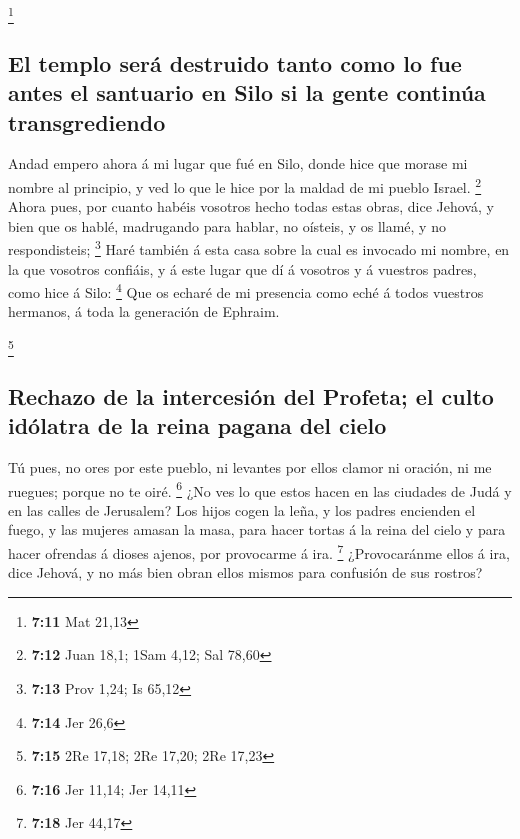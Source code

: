 \footnote{\textbf{7:11} Mat 21,13}

\hypertarget{el-templo-seruxe1-destruido-tanto-como-lo-fue-antes-el-santuario-en-silo-si-la-gente-continuxfaa-transgrediendo}{%
\subsection{El templo será destruido tanto como lo fue antes el
santuario en Silo si la gente continúa
transgrediendo}\label{el-templo-seruxe1-destruido-tanto-como-lo-fue-antes-el-santuario-en-silo-si-la-gente-continuxfaa-transgrediendo}}

 Andad empero ahora á mi lugar que fué en Silo, donde
hice que morase mi nombre al principio, y ved lo que le hice por la
maldad de mi pueblo Israel. \footnote{\textbf{7:12} Juan 18,1; 1Sam
  4,12; Sal 78,60}  Ahora pues, por cuanto habéis
vosotros hecho todas estas obras, dice Jehová, y bien que os hablé,
madrugando para hablar, no oísteis, y os llamé, y no respondisteis;
\footnote{\textbf{7:13} Prov 1,24; Is 65,12}  Haré
también á esta casa sobre la cual es invocado mi nombre, en la que
vosotros confiáis, y á este lugar que dí á vosotros y á vuestros padres,
como hice á Silo: \footnote{\textbf{7:14} Jer 26,6}  Que
os echaré de mi presencia como eché á todos vuestros hermanos, á toda la
generación de Ephraim.

\footnote{\textbf{7:15} 2Re 17,18; 2Re 17,20; 2Re 17,23}

\hypertarget{rechazo-de-la-intercesiuxf3n-del-profeta-el-culto-iduxf3latra-de-la-reina-pagana-del-cielo}{%
\subsection{Rechazo de la intercesión del Profeta; el culto idólatra de
la reina pagana del
cielo}\label{rechazo-de-la-intercesiuxf3n-del-profeta-el-culto-iduxf3latra-de-la-reina-pagana-del-cielo}}

 Tú pues, no ores por este pueblo, ni levantes por ellos
clamor ni oración, ni me ruegues; porque no te oiré. \footnote{\textbf{7:16}
  Jer 11,14; Jer 14,11}  ¿No ves lo que estos hacen en
las ciudades de Judá y en las calles de Jerusalem?  Los
hijos cogen la leña, y los padres encienden el fuego, y las mujeres
amasan la masa, para hacer tortas á la reina del cielo y para hacer
ofrendas á dioses ajenos, por provocarme á ira. \footnote{\textbf{7:18}
  Jer 44,17}  ¿Provocaránme ellos á ira, dice Jehová, y
no más bien obran ellos mismos para confusión de sus rostros?


